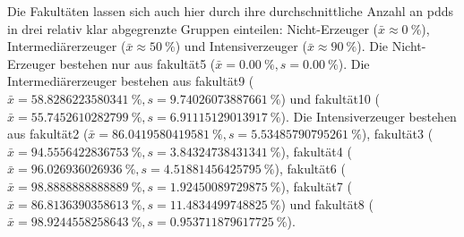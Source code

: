 Die Fakultäten lassen sich auch hier durch ihre durchschnittliche Anzahl an \glspl{pdd} in drei relativ klar abgegrenzte Gruppen einteilen: Nicht-Erzeuger ($\bar{x}\approx\SI[round-mode=places,round-precision=2]{0}{\percent}$), Intermediärerzeuger ($\bar{x}\approx\SI[round-mode=places,round-precision=2]{50}{\percent}$) und Intensiverzeuger ($\bar{x}\approx\SI[round-mode=places,round-precision=2]{90}{\percent}$).
Die Nicht-Erzeuger bestehen nur aus \gls{fakultät5} ($\bar{x}=\SI[round-mode=places,round-precision=2]{0.00}{\percent},s=\SI[round-mode=places,round-precision=2]{0.00}{\percent}$).
Die Intermediärerzeuger bestehen aus \gls{fakultät9} ($\bar{x}=\SI[round-mode=places,round-precision=2]{58.8286223580341}{\percent},s=\SI[round-mode=places,round-precision=2]{9.74026073887661}{\percent}$) und \gls{fakultät10} ($\bar{x}=\SI[round-mode=places,round-precision=2]{55.7452610282799}{\percent},s=\SI[round-mode=places,round-precision=2]{6.91115129013917}{\percent}$).
Die Intensiverzeuger bestehen aus \gls{fakultät2} ($\bar{x}=\SI[round-mode=places,round-precision=2]{86.0419580419581}{\percent},s=\SI[round-mode=places,round-precision=2]{5.53485790795261}{\percent}$), \gls{fakultät3} ($\bar{x}=\SI[round-mode=places,round-precision=2]{94.5556422836753}{\percent},s=\SI[round-mode=places,round-precision=2]{3.84324738431341}{\percent}$), \gls{fakultät4} ($\bar{x}=\SI[round-mode=places,round-precision=2]{96.026936026936}{\percent},s=\SI[round-mode=places,round-precision=2]{4.51881456425795}{\percent}$), \gls{fakultät6} ($\bar{x}=\SI[round-mode=places,round-precision=2]{98.8888888888889}{\percent},s=\SI[round-mode=places,round-precision=2]{1.92450089729875}{\percent}$), \gls{fakultät7} ($\bar{x}=\SI[round-mode=places,round-precision=2]{86.8136390358613}{\percent},s=\SI[round-mode=places,round-precision=2]{11.4834499748825}{\percent}$) und \gls{fakultät8} ($\bar{x}=\SI[round-mode=places,round-precision=2]{98.9244558258643}{\percent},s=\SI[round-mode=places,round-precision=2]{0.953711879617725}{\percent}$).

